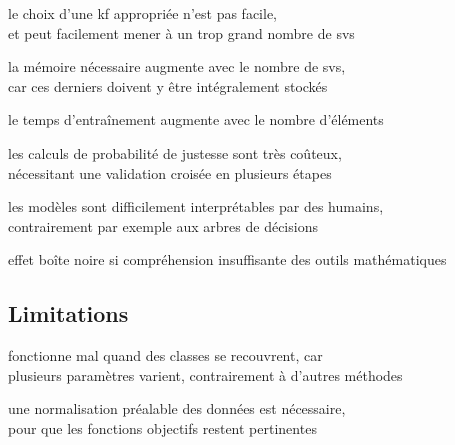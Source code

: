 \begin{itmz}

\item{le choix d’une \gls{kf} appropriée n’est pas facile,\\
et peut facilement mener à un trop grand nombre de \glspl{sv}}

\end{itmz}\begin{itmz}

\item{la mémoire nécessaire augmente avec le nombre de \glspl{sv},\\
car ces derniers doivent y être intégralement stockés}

\end{itmz}\begin{itmz}

\item{le temps d’entraînement augmente avec le nombre d’éléments}

\end{itmz}\begin{itmz}

\item{les calculs de probabilité de justesse sont très coûteux,\\
nécessitant une validation croisée en plusieurs étapes}

\end{itmz}\begin{itmz}

\item{les modèles sont difficilement interprétables par des humains,\\
contrairement par exemple aux arbres de décisions}

\end{itmz}\begin{itmz}

\item{effet boîte noire si compréhension insuffisante des outils mathématiques}

\end{itmz}


\subsection{Limitations}


\begin{itmz}

\item{fonctionne mal quand des classes se recouvrent, car\\
plusieurs paramètres varient, contrairement à d’autres méthodes}

\end{itmz}\begin{itmz}

\item{une normalisation préalable des données est nécessaire,\\
pour que les fonctions objectifs restent pertinentes}

\end{itmz}


\pagebreak
